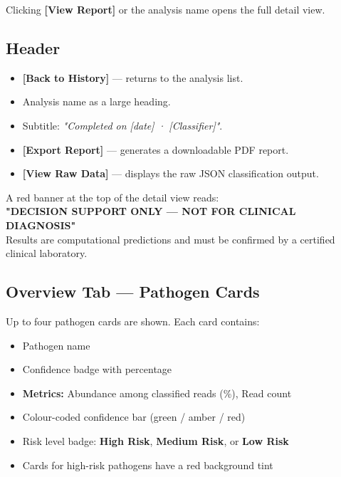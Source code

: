 \documentclass[12pt,a4paper]{report}
\newcommand{\btn}[1]{\textbf{\textcolor{primary}{[#1]}}}
\newcommand{\badge}[2]{\colorbox{#1!20}{\textcolor{#1!70!black}{\small\textbf{#2}}}}
\begin{document}
Clicking \btn{View Report} or the analysis name opens the full detail view.

\subsection{Header}

\begin{itemize}[leftmargin=1.5em]
  \item \btn{Back to History} — returns to the analysis list.
  \item Analysis name as a large heading.
  \item Subtitle: \textit{"Completed on [date] · [Classifier]"}.
  \item \btn{Export Report} — generates a downloadable PDF report.
  \item \btn{View Raw Data} — displays the raw JSON classification output.
\end{itemize}

\begin{importantbox}
  A red banner at the top of the detail view reads:\\
  \textbf{"DECISION SUPPORT ONLY — NOT FOR CLINICAL DIAGNOSIS"}\\
  Results are computational predictions and must be confirmed by a certified clinical laboratory.
\end{importantbox}

\subsection{Overview Tab — Pathogen Cards}

Up to four pathogen cards are shown. Each card contains:

\begin{itemize}[leftmargin=1.5em]
  \item Pathogen name
  \item Confidence badge with percentage
  \item \textbf{Metrics:} Abundance among classified reads (\%), Read count
  \item Colour-coded confidence bar (green / amber / red)
  \item Risk level badge: \badge{danger}{High Risk}, \badge{warning}{Medium Risk}, or \badge{success}{Low Risk}
  \item Cards for high-risk pathogens have a red background tint
\end{itemize}
\end{document}
